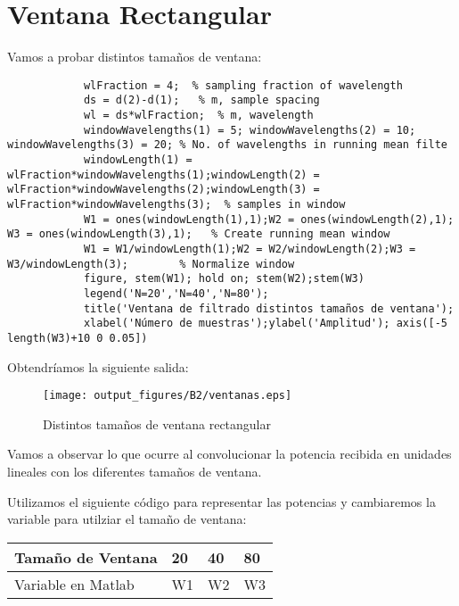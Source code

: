 \documentclass{article}
\begin{document}
    \section{Ventana Rectangular}
        \par Vamos a probar distintos tamaños de ventana:
        \begin{lstlisting}
            wlFraction = 4;  % sampling fraction of wavelength
            ds = d(2)-d(1);   % m, sample spacing 
            wl = ds*wlFraction;  % m, wavelength
            windowWavelengths(1) = 5; windowWavelengths(2) = 10; windowWavelengths(3) = 20; % No. of wavelengths in running mean filte
            windowLength(1) = wlFraction*windowWavelengths(1);windowLength(2) = wlFraction*windowWavelengths(2);windowLength(3) = wlFraction*windowWavelengths(3);  % samples in window 
            W1 = ones(windowLength(1),1);W2 = ones(windowLength(2),1); W3 = ones(windowLength(3),1);   % Create running mean window
            W1 = W1/windowLength(1);W2 = W2/windowLength(2);W3 = W3/windowLength(3);        % Normalize window
            figure, stem(W1); hold on; stem(W2);stem(W3)
            legend('N=20','N=40','N=80');
            title('Ventana de filtrado distintos tamaños de ventana');
            xlabel('Número de muestras');ylabel('Amplitud'); axis([-5 length(W3)+10 0 0.05])
        \end{lstlisting}
        \par Obtendríamos la siguiente salida:
        \begin{figure}[h]
            \centering
            \texttt{[image: output\_figures/B2/ventanas.eps]}
            \caption{Distintos tamaños de ventana rectangular}
            \label{fig:my_label}
        \end{figure}
        \par Vamos a observar lo que ocurre al convolucionar la potencia recibida en unidades lineales con los diferentes tamaños de ventana.
        \par Utilizamos el siguiente código para representar las potencias y cambiaremos la variable  para utilziar el tamaño de ventana:
                        
        \begin{table}[h]
            \centering
            \begin{tabular}{|l|l|l|l|}
                \hline
                    Tamaño de Ventana  & 20 & 40 & 80 \\ \hline
                    Variable en Matlab & W1 & W2 & W3 \\ \hline
                \end{tabular}
            \end{table}
\end{document}
